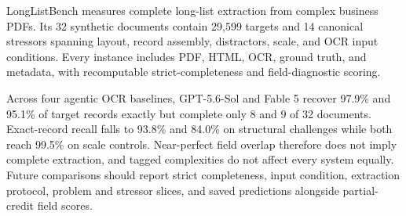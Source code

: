 LongListBench measures complete long-list extraction from complex business PDFs. Its 32 synthetic documents contain 29{,}599 targets and 14 canonical stressors spanning layout, record assembly, distractors, scale, and OCR input conditions. Every instance includes PDF, HTML, OCR, ground truth, and metadata, with recomputable strict-completeness and field-diagnostic scoring.

Across four agentic OCR baselines, GPT-5.6-Sol and Fable 5 recover 97.9\% and 95.1\% of target records exactly but complete only 8 and 9 of 32 documents. Exact-record recall falls to 93.8\% and 84.0\% on structural challenges while both reach 99.5\% on scale controls. Near-perfect field overlap therefore does not imply complete extraction, and tagged complexities do not affect every system equally. Future comparisons should report strict completeness, input condition, extraction protocol, problem and stressor slices, and saved predictions alongside partial-credit field scores.
